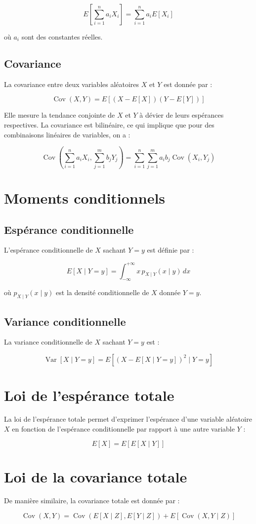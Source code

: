 \documentclass{article}
\begin{document}
\[
E\left[ \sum_{i=1}^n a_i X_i \right] = \sum_{i=1}^n a_i E[X_i]
\]

où $a_i$ sont des constantes réelles.

\subsection{Covariance}

La covariance entre deux variables aléatoires $X$ et $Y$ est donnée par :

\[
\operatorname{Cov}(X, Y) = E\left[ (X - E[X])(Y - E[Y]) \right]
\]

Elle mesure la tendance conjointe de $X$ et $Y$ à dévier de leurs espérances respectives. La covariance est bilinéaire, ce qui implique que pour des combinaisons linéaires de variables, on a :

\[
\operatorname{Cov}\left( \sum_{i=1}^n a_i X_i, \sum_{j=1}^m b_j Y_j \right) = \sum_{i=1}^n \sum_{j=1}^m a_i b_j \operatorname{Cov}(X_i, Y_j)
\]

\section{Moments conditionnels}

\subsection{Espérance conditionnelle}

L'espérance conditionnelle de $X$ sachant $Y = y$ est définie par :

\[
E[X \mid Y = y] = \int_{-\infty}^{+\infty} x \, p_{X \mid Y}(x \mid y) \, dx
\]

où $p_{X \mid Y}(x \mid y)$ est la densité conditionnelle de $X$ donnée $Y = y$.

\subsection{Variance conditionnelle}

La variance conditionnelle de $X$ sachant $Y = y$ est :

\[
\operatorname{Var}[X \mid Y = y] = E\left[ (X - E[X \mid Y = y])^2 \mid Y = y \right]
\]

\section{Loi de l'espérance totale}

La loi de l'espérance totale permet d'exprimer l'espérance d'une variable aléatoire $X$ en fonction de l'espérance conditionnelle par rapport à une autre variable $Y$ :

\[
E[X] = E[E[X \mid Y]]
\]

\section{Loi de la covariance totale}

De manière similaire, la covariance totale est donnée par :

\[
\operatorname{Cov}(X, Y) = \operatorname{Cov}\left( E[X \mid Z], E[Y \mid Z] \right) + E\left[ \operatorname{Cov}(X, Y \mid Z) \right]
\]
\end{document}
